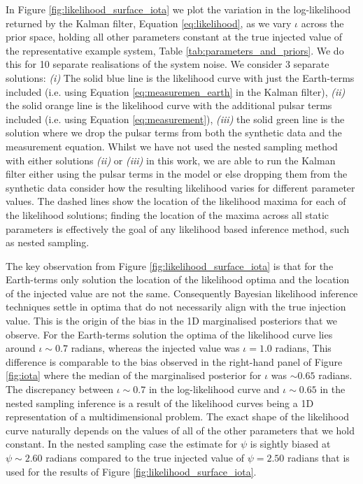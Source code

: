 \documentclass[fleqn,usenatbib,useAMS]{mnras}
\begin{document}
In Figure \ref{fig:likelihood_surface_iota} we plot the variation in the log-likelihood returned by the Kalman filter, Equation \eqref{eq:likelihood}, as we vary $\iota$ across the prior space, holding all other parameters constant at the true injected value of the representative example system, Table \ref{tab:parameters_and_priors}. We do this for 10 separate realisations of the system noise. We consider 3 separate solutions: \textit{(i)} The solid blue line is the likelihood curve with just the Earth-terms included (i.e. using Equation \ref{eq:measuremen_earth} in the Kalman filter), \textit{(ii)} the solid orange line is the likelihood curve with the additional pulsar terms included (i.e. using Equation \ref{eq:measurement}), \textit{(iii)} the solid green line is the solution where we drop the pulsar terms from both the synthetic data and the measurement equation. Whilst we have not used the nested sampling method with either solutions \textit{(ii)} or \textit{(iii)} in this work, we are able to run the Kalman filter either using the pulsar terms in the model or else dropping them from the synthetic data consider how the resulting likelihood varies for different parameter values. The dashed lines show the location of the likelihood maxima for each of the likelihood solutions; finding the location of the maxima across all static parameters is effectively the goal of any likelihood based inference method, such as nested sampling. \newline  

The key observation from Figure \ref{fig:likelihood_surface_iota} is that for the Earth-terms only solution the location of the likelihood optima and the location of the injected value are not the same. Consequently Bayesian likelihood inference techniques settle in optima that do not necessarily align with the true injection value. This is the origin of the bias in the 1D marginalised posteriors that we observe.  For the Earth-terms solution the optima of the likelihood curve lies around $\iota \sim 0.7$ radians, whereas the injected value was $\iota = 1.0$ radians, This difference is comparable to the bias observed in the right-hand panel of Figure \ref{fig:iota} where the median of the marginalised posterior for $\iota$ was $\sim 0.65$ radians. The discrepancy between $\iota \sim 0.7$ in the log-likelihood curve and $\iota \sim 0.65$ in the nested sampling inference is a result of the likelihood curves being a 1D representation of a multidimensional problem. The exact shape of the likelihood curve naturally depends on the values of all of the other parameters that we hold constant. In the nested sampling case the estimate for $\psi$ is sightly biased at $\psi \sim 2.60$ radians compared to the true injected value of $\psi = 2.50$ radians that is used for the results of Figure \ref{fig:likelihood_surface_iota}. \newline 
\end{document}

